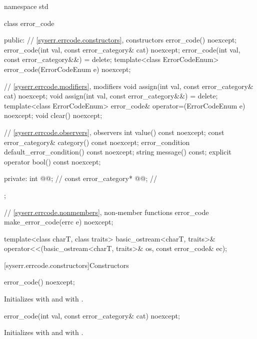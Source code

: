 %
\begin{codeblock}
namespace std {
  class error_code {
  public:
    // \ref{syserr.errcode.constructors}, constructors
    error_code() noexcept;
    error_code(int val, const error_category& cat) noexcept;
    error_code(int val, const error_category&&) = delete;
    template<class ErrorCodeEnum>
      error_code(ErrorCodeEnum e) noexcept;

    // \ref{syserr.errcode.modifiers}, modifiers
    void assign(int val, const error_category& cat) noexcept;
    void assign(int val, const error_category&&) = delete;
    template<class ErrorCodeEnum>
      error_code& operator=(ErrorCodeEnum e) noexcept;
    void clear() noexcept;

    // \ref{syserr.errcode.observers}, observers
    int value() const noexcept;
    const error_category& category() const noexcept;
    error_condition default_error_condition() const noexcept;
    string message() const;
    explicit operator bool() const noexcept;

  private:
    int @@;                   // \expos
    const error_category* @@; // \expos
  };

  // \ref{syserr.errcode.nonmembers}, non-member functions
  error_code make_error_code(errc e) noexcept;

  template<class charT, class traits>
    basic_ostream<charT, traits>&
      operator<<(basic_ostream<charT, traits>& os, const error_code& ec);
}
\end{codeblock}

[syserr.errcode.constructors]{Constructors}

%
\begin{itemdecl}
error_code() noexcept;
\end{itemdecl}

\begin{itemdescr}
\pnum
\effects
Initializes  with 
and  with .
\end{itemdescr}

%
\begin{itemdecl}
error_code(int val, const error_category& cat) noexcept;
\end{itemdecl}

\begin{itemdescr}
\pnum
\effects
Initializes  with 
and  with .
\end{itemdescr}

